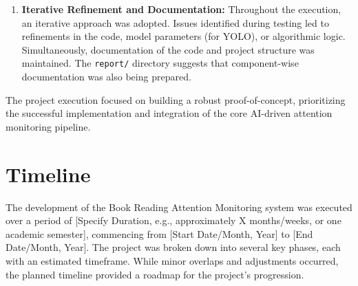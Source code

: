 \begin{enumerate}
    \item \textbf{Iterative Refinement and Documentation:}
    Throughout the execution, an iterative approach was adopted. Issues identified during testing led to refinements in the code, model parameters (for YOLO), or algorithmic logic. Simultaneously, documentation of the code and project structure was maintained. The \texttt{report/} directory suggests that component-wise documentation was also being prepared.
\end{enumerate}
The project execution focused on building a robust proof-of-concept, prioritizing the successful implementation and integration of the core AI-driven attention monitoring pipeline.


\section{Timeline}
The development of the Book Reading Attention Monitoring system was executed over a period of [Specify Duration, e.g., approximately X months/weeks, or one academic semester], commencing from [Start Date/Month, Year] to [End Date/Month, Year]. The project was broken down into several key phases, each with an estimated timeframe. While minor overlaps and adjustments occurred, the planned timeline provided a roadmap for the project's progression.


